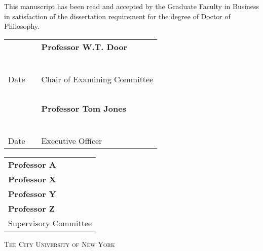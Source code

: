 \begin{center}
This manuscript has been read and accepted by the Graduate Faculty in Business in satisfaction of the dissertation requirement for the degree of Doctor of Philosophy.
\end{center}

\vspace{0.75in}

\begin{tabular}{p{1.75in}p{0.5in}p{3.5in}}
~                                   & & \textbf{Professor W.T. Door}\\
~                                   & & \\
\hrulefill                          & &\hrulefill \\
Date                                & & Chair of Examining Committee\\
~                                   & & \\
~                                   & & \textbf{Professor Tom Jones}\\
~                                   & & \\
\hrulefill                          & &\hrulefill \\
Date                                & & Executive Officer\\
\end{tabular}

\vspace{0.75in}

\begin{tabular}{l}
\textbf{Professor A} \\
\textbf{Professor X} \\
\textbf{Professor Y} \\
\textbf{Professor Z} \\
Supervisory Committee \\
\end{tabular}


\vspace{\fill}
\begin{center}
\textsc{The City University of New York}
\end{center}